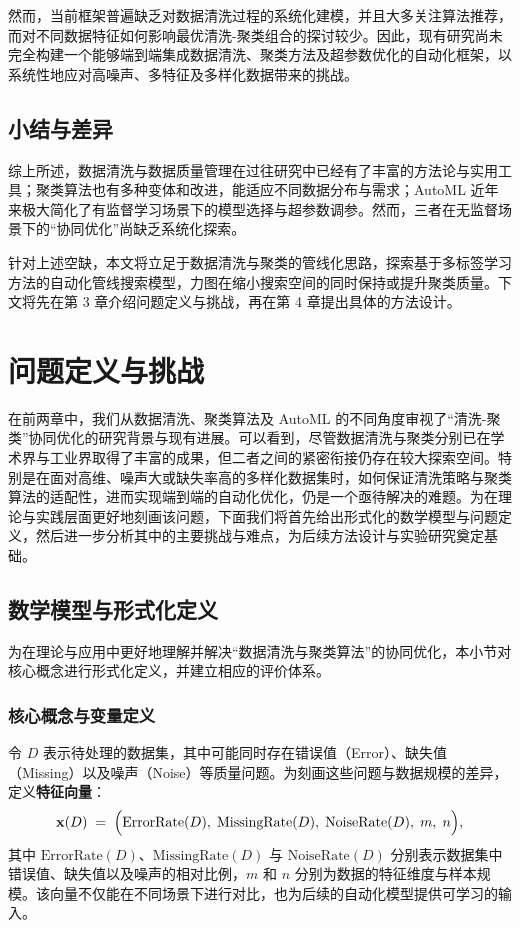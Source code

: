 \documentclass[10pt]{article} %
\numberwithin{equation}{section}
\begin{document}
然而，当前框架普遍缺乏对数据清洗过程的系统化建模，并且大多关注算法推荐，而对不同数据特征如何影响最优清洗-聚类组合的探讨较少。因此，现有研究尚未完全构建一个能够端到端集成数据清洗、聚类方法及超参数优化的自动化框架，以系统性地应对高噪声、多特征及多样化数据带来的挑战。

\subsection{小结与差异}
综上所述，数据清洗与数据质量管理在过往研究中已经有了丰富的方法论与实用工具；聚类算法也有多种变体和改进，能适应不同数据分布与需求；AutoML 近年来极大简化了有监督学习场景下的模型选择与超参数调参。然而，三者在无监督场景下的“协同优化”尚缺乏系统化探索。

针对上述空缺，本文将立足于数据清洗与聚类的管线化思路，探索基于多标签学习方法的自动化管线搜索模型，力图在缩小搜索空间的同时保持或提升聚类质量。下文将先在第 3 章介绍问题定义与挑战，再在第 4 章提出具体的方法设计。


\section{问题定义与挑战}\label{sec:problem-and-model}

在前两章中，我们从数据清洗、聚类算法及 AutoML 的不同角度审视了“清洗-聚类”协同优化的研究背景与现有进展。可以看到，尽管数据清洗与聚类分别已在学术界与工业界取得了丰富的成果，但二者之间的紧密衔接仍存在较大探索空间。特别是在面对高维、噪声大或缺失率高的多样化数据集时，如何保证清洗策略与聚类算法的适配性，进而实现端到端的自动化优化，仍是一个亟待解决的难题。为在理论与实践层面更好地刻画该问题，下面我们将首先给出形式化的数学模型与问题定义，然后进一步分析其中的主要挑战与难点，为后续方法设计与实验研究奠定基础。

\subsection{数学模型与形式化定义}\label{subsec:formal-definition}

为在理论与应用中更好地理解并解决“数据清洗与聚类算法”的协同优化，本小节对核心概念进行形式化定义，并建立相应的评价体系。

\subsubsection{核心概念与变量定义}
令 \(D\) 表示待处理的数据集，其中可能同时存在错误值（Error）、缺失值（Missing）以及噪声（Noise）等质量问题。为刻画这些问题与数据规模的差异，定义\textbf{特征向量}：
\begin{equation}\label{eq:xD}
  \mathbf{x}(D) 
  \;=\; 
  \Bigl(\mathrm{ErrorRate}(D),\;\mathrm{MissingRate}(D),\;\mathrm{NoiseRate}(D),\; m,\; n\Bigr),
\end{equation}
其中 \(\mathrm{ErrorRate}(D)\)、\(\mathrm{MissingRate}(D)\) 与 \(\mathrm{NoiseRate}(D)\) 分别表示数据集中错误值、缺失值以及噪声的相对比例，\(m\) 和 \(n\) 分别为数据的特征维度与样本规模。该向量不仅能在不同场景下进行对比，也为后续的自动化模型提供可学习的输入。
\end{document}
